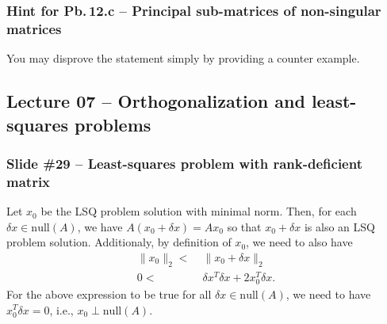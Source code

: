 \documentclass[letterpaper,10pt]{article}
\begin{document}
\subsubsection*{Hint for Pb.$\,$12.c -- Principal sub-matrices of non-singular matrices}
You may disprove the statement simply by providing a counter example.

\subsection*{Lecture 07 -- Orthogonalization and least-squares problems}
\subsubsection*{Slide \#29 -- Least-squares problem with rank-deficient matrix}

Let $x_0$ be the LSQ problem solution with minimal norm.
Then, for each $\delta x\in\mathrm{null}(A)$, we have $A(x_0+\delta x)=Ax_0$ so that $x_0+\delta x$ is also an LSQ problem solution.
Additionaly, by definition of $x_0$, we need to also have 
\begin{align*}
\|x_0\|_2<&\;\|x_0+\delta x\|_2\\
0<&\;\delta x^T\delta x + 2x_0^T\delta x.
\end{align*}
For the above expression to be true for all $\delta x\in\mathrm{null}(A)$, we need to have $x_0^T\delta x=0$, i.e., $x_0\perp\mathrm{null}(A)$.
\end{document}
